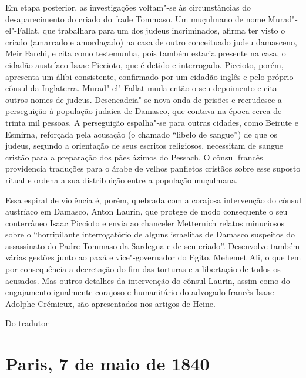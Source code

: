 {Em etapa posterior, as investigações voltam"-se às circunstâncias do
desaparecimento do criado do frade Tommaso. Um muçulmano de nome
Murad"-el"-Fallat, que trabalhara para um dos judeus incriminados,
afirma ter visto o criado (amarrado e amordaçado) na casa de outro
conceituado judeu damasceno, Meir Farchi, e cita como testemunha, pois
também estaria presente na casa, o cidadão austríaco Isaac Piccioto,
que é detido e interrogado. Piccioto, porém, apresenta um álibi
consistente, confirmado por um cidadão inglês e pelo próprio cônsul da
Inglaterra. Murad"-el"-Fallat muda então o seu depoimento e cita
outros nomes de judeus. Desencadeia"-se nova onda de prisões e
recrudesce a perseguição à população judaica de Damasco, que contava na
época cerca de trinta mil pessoas. A perseguição espalha"-se para
outras cidades, como Beirute e Esmirna, reforçada pela acusação (o
chamado “libelo de sangue”) de que os judeus, segundo a orientação de
seus escritos religiosos, necessitam de sangue cristão para a
preparação dos pães ázimos do Pessach. O cônsul francês providencia
traduções para o árabe de velhos panfletos cristãos sobre esse suposto
ritual e ordena a sua distribuição entre a população muçulmana.

Essa espiral de violência é, porém, quebrada com a corajosa intervenção
do cônsul austríaco em Damasco, Anton Laurin, que protege de modo
consequente o seu conterrâneo Isaac Piccioto e envia ao chanceler
Metternich relatos minuciosos sobre o “horripilante interrogatório de
alguns israelitas de Damasco suspeitos do assassinato do Padre Tommaso
da Sardegna e de seu criado”. Desenvolve também várias gestões junto ao
paxá e vice"-governador do Egito, Mehemet Ali, o que tem por
consequência a decretação do fim das torturas e a libertação de todos
os acusados. Mas outros detalhes da intervenção do cônsul Laurin, assim
como do engajamento igualmente corajoso e humanitário do advogado
francês Isaac Adolphe Crémieux, são apresentados nos artigos de Heine.
}

\hfill Do tradutor

\chapter{Paris, 7 de maio de 1840}

